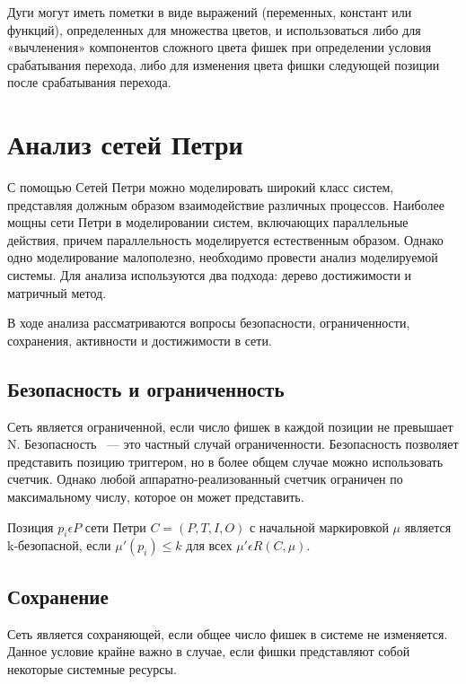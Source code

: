 Дуги могут иметь пометки в виде выражений (переменных, констант или функций), определенных для множества цветов, и использоваться либо для «вычленения» компонентов сложного цвета фишек при определении условия срабатывания перехода, либо для изменения цвета фишки следующей позиции после срабатывания перехода. \cite{Kristensen}

\section{Анализ сетей Петри}

С помощью Сетей Петри можно моделировать широкий класс систем, представляя должным образом взаимодействие различных процессов. Наиболее мощны сети Петри в моделировании систем, включающих параллельные действия, причем параллельность моделируется естественным образом. Однако одно моделирование малополезно, необходимо провести анализ моделируемой системы. Для анализа используются два подхода: дерево достижимости и матричный метод.

В ходе анализа рассматриваются вопросы безопасности, ограниченности, сохранения, активности и достижимости в сети.
\subsection*{Безопасность и ограниченность}
Сеть является ограниченной, если число фишек в каждой позиции не превышает N. Безопасность ~--- это частный случай ограниченности. Безопасность позволяет представить позицию триггером, но в более общем случае можно использовать счетчик. Однако любой аппаратно-реализованный счетчик ограничен по максимальному числу, которое он может представить.

Позиция $ p_{i} \epsilon P $ сети Петри $ C = (P, T, I, O) $ с начальной маркировкой $ \mu $ является k-безопасной, если $ \mu'(p_{i}) \leqslant k $ для всех $ \mu' \epsilon R(C, \mu) $.

\subsection*{Сохранение}
Сеть является сохраняющей, если общее число фишек в системе не изменяется. Данное условие крайне важно в случае, если фишки представляют собой некоторые системные ресурсы.

